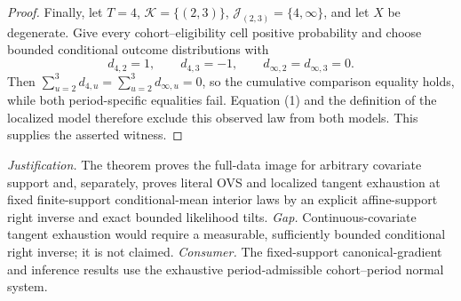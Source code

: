 \documentclass{article}
\begin{document}
\begin{proof}
Finally, let \(T=4\), \(\mathcal K=\{(2,3)\}\), \(\mathcal J_{(2,3)}=\{4,\infty\}\), and let \(X\) be degenerate.  Give every cohort--eligibility cell positive probability and choose bounded conditional outcome distributions with
\[
d_{4,2}=1,\qquad d_{4,3}=-1,
\qquad d_{\infty,2}=d_{\infty,3}=0.
\]
Then \(\sum_{u=2}^3d_{4,u}=\sum_{u=2}^3d_{\infty,u}=0\), so the cumulative comparison equality holds, while both period-specific equalities fail.  Equation (1) and the definition of the localized model therefore exclude this observed law from both models.  This supplies the asserted witness.
\end{proof}
\par\smallskip\noindent \textit{Justification.} The theorem proves the full-data image for arbitrary covariate support and, separately, proves literal OVS and localized tangent exhaustion at fixed finite-support conditional-mean interior laws by an explicit affine-support right inverse and exact bounded likelihood tilts. \textit{Gap.} Continuous-covariate tangent exhaustion would require a measurable, sufficiently bounded conditional right inverse; it is not claimed. \textit{Consumer.} The fixed-support canonical-gradient and inference results use the exhaustive period-admissible cohort--period normal system.
\end{document}
